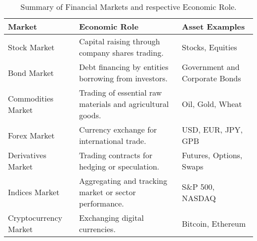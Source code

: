 \begin{table}[htb!]
\caption{Summary of Financial Markets and respective Economic Role\cite{brandimarte_introduction_2018}.}
\label{Tables:FinancialMarkets}
\centering
\footnotesize
\begin{tabularx}{\textwidth}{@{}lXl@{}}
\toprule
\textbf{Market} & \textbf{Economic Role} & \textbf{Asset Examples} \\
\midrule
Stock Market & Capital raising through company shares trading. & Stocks, Equities \\
\addlinespace
Bond Market & Debt financing by entities borrowing from investors. & Government and Corporate Bonds \\
\addlinespace
Commodities Market & Trading of essential raw materials and agricultural goods. & Oil, Gold, Wheat \\
\addlinespace
Forex Market & Currency exchange for international trade. & USD, EUR, JPY, GPB \\
\addlinespace
Derivatives Market & Trading contracts for hedging or speculation. & Futures, Options, Swaps \\
\addlinespace
Indices Market & Aggregating and tracking market or sector performance. & S\&P 500, NASDAQ \\
\addlinespace
Cryptocurrency Market & Exchanging digital currencies. & Bitcoin, Ethereum \\
\bottomrule
\end{tabularx}
\end{table}
